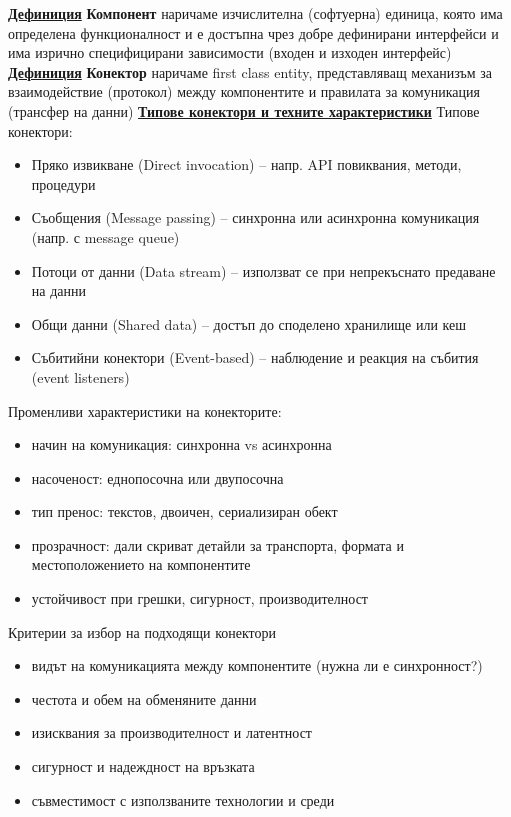 \documentclass{article}
\begin{document}
\textbf{\underline{Дефиниция}}
\textbf{Компонент} наричаме изчислителна (софтуерна) единица, която има определена функционалност и е достъпна чрез добре дефинирани
интерфейси и има изрично специфицирани зависимости (входен и изходен интерфейс) \newline\newline
\textbf{\underline{Дефиниция}}
\textbf{Конектор} наричаме first class entity, представляващ механизъм за взаимодействие (протокол) между компонентите и правилата за
комуникация (трансфер на данни) \newline\newline
\textbf{\underline{Типове конектори и техните характеристики}} \newline\newline
Типове конектори:
\begin{itemize}
    \item Пряко извикване (Direct invocation) – напр. API повиквания, методи, процедури
    \item Съобщения (Message passing) – синхронна или асинхронна комуникация (напр. с message queue)
    \item Потоци от данни (Data stream) – използват се при непрекъснато предаване на данни
    \item Общи данни (Shared data) – достъп до споделено хранилище или кеш
    \item Събитийни конектори (Event-based) – наблюдение и реакция на събития (event listeners)
\end{itemize}
Променливи характеристики на конекторите:
\begin{itemize}
    \item начин на комуникация: синхронна vs асинхронна
    \item насоченост: еднопосочна или двупосочна
    \item тип пренос: текстов, двоичен, сериализиран обект
    \item прозрачност: дали скриват детайли за транспорта, формата и местоположението на компонентите
    \item устойчивост при грешки, сигурност, производителност
\end{itemize}
Критерии за избор на подходящи конектори
\begin{itemize}
    \item видът на комуникацията между компонентите (нужна ли е синхронност?)
    \item честота и обем на обменяните данни
    \item изисквания за производителност и латентност
    \item сигурност и надеждност на връзката
    \item съвместимост с използваните технологии и среди
\end{itemize}
\end{document}

